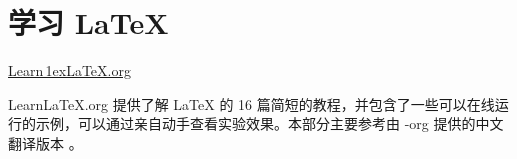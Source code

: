 
\part{学习 \LaTeX{}}

\begin{frame}[plain]
  \vfil
  \begin{center}
    \href{https://learnlatex.org}{
      \rmfamily
      Learn\,\lower1ex\hbox{\Huge\LaTeX{}}.org
    }
  \end{center}
  \vfil
  \begin{center}
    \parbox{0.75\linewidth}{
      Learn\LaTeX{}.org 提供了解 \LaTeX{} 的 16 篇简短的教程，并包含了一些可以在线运行的示例，可以通过亲自动手查看实验效果。本部分主要参考由 \CTeX{}-org 提供的中文翻译版本 。
    }
  \end{center}
  \vfil
\end{frame}

